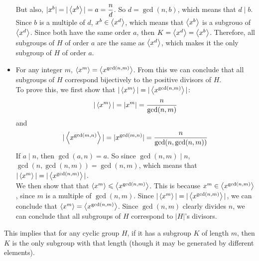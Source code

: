 \documentclass[12pt]{article}
\begin{document}
\begin{itemize}[label=$\diamond$]
            But also, $|x^b| = |\left\langle x^b \right\rangle| = a = \dfrac{n}{d}$.
            So $d = \gcd(n, b)$, which means that $d \mid b$.
            Since $b$ is a multiple of $d$, $x^b \in \left\langle x^d \right\rangle$,
            which means that $\left\langle x^b \right\rangle$ is a subgrouo of $\left\langle x^d \right\rangle$.
            Since both have the same order $a$,
            then $K = \left\langle x^d \right\rangle = \left\langle x^b \right\rangle$.
            Therefore, all subgroups of $H$ of order $a$
            are the same as $\left\langle x^d \right\rangle$,
            which makes it the only subgroup of $H$
            of order $a$.
        \item
            For any integer $m$,
            $\left\langle x^m \right\rangle = \left\langle x^{\gcd(n, m)} \right\rangle$.
            From this we can conclude that all subgroups of $H$
            correspond bijectively to the positive divisors of $H$. \\
            To prove this,
            we first show that $|\left\langle x^m \right\rangle| = |\left\langle x^{\gcd(n, m)} \right\rangle|$:
            \[ |\left\langle x^m \right\rangle| = |x^m| = \dfrac{n}{\gcd(n, m)} \]
            and 
            \[ |\left\langle x^{\gcd(m, n)} \right\rangle|
            = |x^{\gcd(m, n)}|
            = \dfrac{n}{\gcd(n, \gcd(n, m))} \]
            If $a \mid n$, then $\gcd(a, n) = a$.
            So since $\gcd(n, m) \mid n$,
            $\gcd(n, \gcd(n, m)) = \gcd(n, m)$,
            which means that $|\left\langle x^m \right\rangle| = |\left\langle x^{\gcd(n, m)} \right\rangle|$. \\
            We then show that 
            that $\left\langle x^m \right\rangle \leqslant \left\langle x^{\gcd(n, m)} \right\rangle$.
            This is because $x^m \in \left\langle x^{\gcd(n, m)} \right\rangle$,
            since $m$ is a multiple of $\gcd(n, m)$.
            Since $|\left\langle x^m \right\rangle| = |\left\langle x^{\gcd(n, m)} \right\rangle|$,
            we can conclude that $\left\langle x^m \right\rangle = \left\langle x^{\gcd(n, m)} \right\rangle$.
            Since $\gcd(n, m)$ clearly divides $n$,
            we can conclude that all subgroups of $H$
            correspond to $|H|$'s divisors.
    \end{itemize}

    This implies that for any cyclic group $H$,
    if it has a subgroup $K$ of length $m$,
    then $K$ is the only subgroup with that length
    (though it may be generated by different elements). \\
\end{document}
